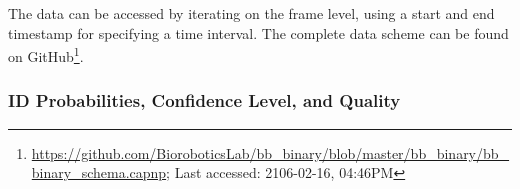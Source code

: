 The data can be accessed by iterating on the frame level, using a start and end time\-stamp for specifying a time interval. The complete data scheme can be found on GitHub\footnote{\url{https://github.com/BioroboticsLab/bb_binary/blob/master/bb_binary/bb_binary_schema.capnp}; Last accessed: 2106-02-16, 04:46PM}. 



\subsubsection{ID Probabilities, Confidence Level, and Quality}
\label{subsec:confidence}

